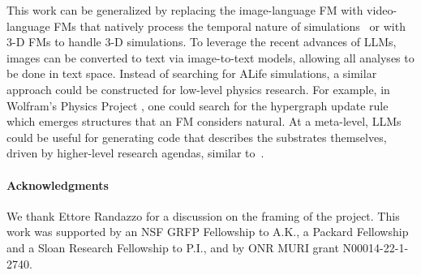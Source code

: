 \documentclass{article}
\begin{document}
This work can be generalized by replacing the image-language FM with video-language FMs that natively process the temporal nature of simulations~\citep{tang2023video, xu2021videoclip} or with 3-D FMs to handle 3-D simulations.
To leverage the recent advances of LLMs, images can be converted to text via image-to-text models, allowing all analyses to be done in text space.
Instead of searching for ALife simulations, a similar approach could be constructed for low-level physics research.
For example, in Wolfram's Physics Project \citep{wolfram2020class}, one could search for the hypergraph update rule which emerges structures that an FM considers natural.
At a meta-level, LLMs could be useful for generating code that describes the substrates themselves, driven by higher-level research agendas, similar to~\citet{faldor2024omni, lu2024discovering, lu2024ai}.


{
\paragraph{Acknowledgments }
We thank Ettore Randazzo for a discussion on the framing of the project.
This work was supported by an NSF GRFP Fellowship to A.K., a Packard Fellowship and a Sloan Research Fellowship to P.I., and by ONR MURI grant N00014-22-1-2740.
}





\newpage
\appendix
\end{document}
